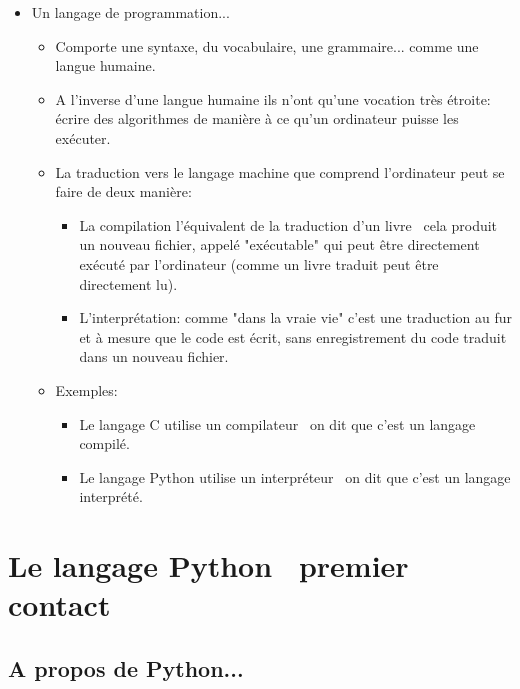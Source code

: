 \documentclass[12pt]{article}
\begin{document}
	\begin{itemize}
		\item Un langage de programmation...
		
		\begin{itemize}
			\item Comporte une syntaxe, du vocabulaire, une grammaire... comme une langue humaine.
			\item A l'inverse d'une langue humaine ils n'ont qu'une vocation très étroite: écrire des algorithmes de manière à ce qu'un ordinateur puisse les exécuter.
			\item La traduction vers le langage machine que comprend l'ordinateur peut se faire de deux manière:
			
			\begin{itemize}
				\item La compilation  l'équivalent de la traduction d'un livre \textemdash\ cela produit un nouveau fichier, appelé "exécutable" qui peut être directement exécuté par l'ordinateur (comme un livre traduit peut être directement lu).
				\item L'interprétation: comme "dans la vraie vie" c'est une traduction au fur et à mesure que le code est écrit, sans enregistrement du code traduit dans un nouveau fichier.
			\end{itemize}
			\item Exemples:
			
			\begin{itemize}
				\item Le langage C utilise un compilateur \textemdash\ on dit que c'est un langage compilé.
				\item Le langage Python utilise un interpréteur \textemdash\ on dit que c'est un langage interprété.
			\end{itemize}
		\end{itemize}
	\end{itemize}
		
	\pagebreak
		
	\section{Le langage Python \textemdash\ premier contact}
	
	\subsection{A propos de Python...}
\end{document}
